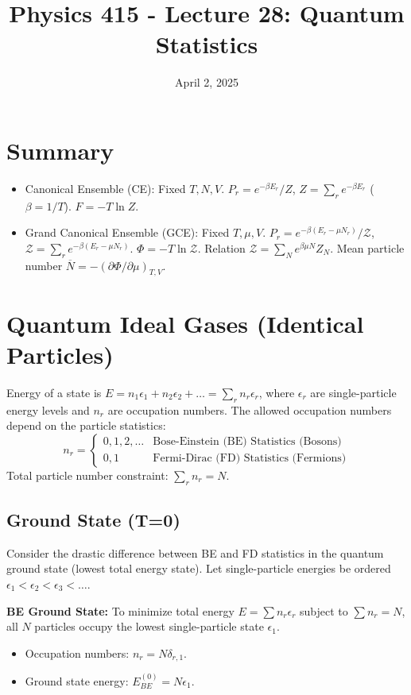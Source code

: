 \documentclass[11pt]{article}
\title{Physics 415 - Lecture 28: Quantum Statistics}
\date{April 2, 2025}
\author{} %
\newcommand{\avg}[1]{\overline{#1}}
\newcommand{\partfn}{Z} %
\newcommand{\grandpartfn}{\mathcal{Z}} %
\newcommand{\eps}{\epsilon}
\begin{document}
\maketitle
\thispagestyle{empty}

\section*{Summary}

\begin{itemize}
    \item Canonical Ensemble (CE): Fixed $T, N, V$. $P_r = e^{-\beta E_r} / \partfn$, $\partfn = \sum_r e^{-\beta E_r}$ ($\beta=1/T$). $F = -T \ln \partfn$.
    \item Grand Canonical Ensemble (GCE): Fixed $T, \mu, V$. $P_r = e^{-\beta(E_r - \mu N_r)} / \grandpartfn$, $\grandpartfn = \sum_r e^{-\beta(E_r - \mu N_r)}$. $\Phi = -T \ln \grandpartfn$. Relation $\grandpartfn = \sum_N e^{\beta \mu N} Z_N$. Mean particle number $\avg{N} = -(\partial \Phi / \partial \mu)_{T,V}$.
\end{itemize}

\section*{Quantum Ideal Gases (Identical Particles)}

Energy of a state is $E = n_1 \eps_1 + n_2 \eps_2 + \dots = \sum_r n_r \eps_r$, where $\eps_r$ are single-particle energy levels and $n_r$ are occupation numbers.
The allowed occupation numbers depend on the particle statistics:
\[ n_r = \begin{cases} 0, 1, 2, \dots & \text{Bose-Einstein (BE) Statistics (Bosons)} \\ 0, 1 & \text{Fermi-Dirac (FD) Statistics (Fermions)} \end{cases} \]
Total particle number constraint: $\sum_r n_r = N$.

\subsection*{Ground State (T=0)}
Consider the drastic difference between BE and FD statistics in the quantum ground state (lowest total energy state). Let single-particle energies be ordered $\eps_1 < \eps_2 < \eps_3 < \dots$.

\textbf{BE Ground State:} To minimize total energy $E = \sum n_r \eps_r$ subject to $\sum n_r = N$, all $N$ particles occupy the lowest single-particle state $\eps_1$.
\begin{itemize}
    \item Occupation numbers: $n_r = N \delta_{r,1}$.
    \item Ground state energy: $E_{BE}^{(0)} = N \eps_1$.
\end{itemize}
\end{document}
